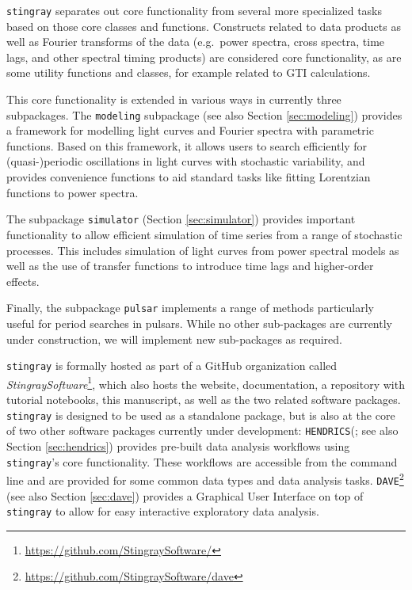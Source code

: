\documentclass[twocolumn]{aastex62}
\newcommand{\stingray}{\texttt{stingray}\xspace}
\newcommand{\hendrics}{\texttt{HENDRICS}\xspace}
\newcommand{\dave}{\texttt{DAVE}\xspace}
\begin{document}
\stingray separates out core functionality from several more specialized tasks based on those core classes and functions. Constructs related to data products as well as Fourier transforms of the data (e.g.\ power spectra, cross spectra, time lags, and other spectral timing products) are considered core functionality, as are some utility functions and classes, for example related to GTI calculations. 

This core functionality is extended in various ways in currently three subpackages. The \texttt{modeling} subpackage (see also Section \ref{sec:modeling}) provides a framework for modelling light curves and Fourier spectra with parametric functions. Based on this framework, it allows users to search efficiently for (quasi-)periodic oscillations in light curves with stochastic variability, and provides convenience functions to aid standard tasks like fitting Lorentzian functions to power spectra. 

The subpackage \texttt{simulator} (Section \ref{sec:simulator}) provides important functionality to allow efficient simulation of time series from a range of stochastic processes. This includes simulation of light curves from power spectral models as well as the use of transfer functions to introduce time lags and higher-order effects. 

Finally, the subpackage \texttt{pulsar} implements a range of methods particularly useful for period searches in pulsars. While no other sub-packages are currently under construction, we will implement new sub-packages as required. 


\stingray is formally hosted as part of a GitHub organization called \textit{StingraySoftware}\footnote{\url{https://github.com/StingraySoftware/}}, which also hosts the website, documentation, a repository with tutorial notebooks, this manuscript, as well as the two related software packages. \stingray is designed to be used as a standalone package, but is also at the core of two other software packages currently under development: \hendrics (\citealt{hendrics}; see also Section \ref{sec:hendrics}) provides pre-built data analysis workflows using \stingray's core functionality. These workflows are accessible from the command line and are provided for some common data types and data analysis tasks. \dave\footnote{\url{https://github.com/StingraySoftware/dave}} (see also Section \ref{sec:dave}) provides a Graphical User Interface on top of \stingray to allow for easy interactive exploratory data analysis.
 
\end{document}
